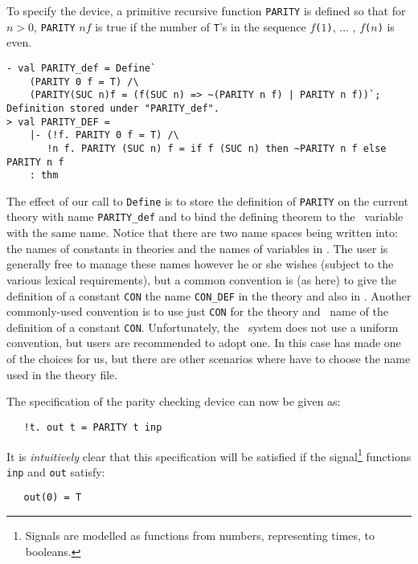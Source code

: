 \noindent To specify the device, a primitive recursive
function {\small\verb|PARITY|} is defined so that for $n>0$,
{\small\tt PARITY} $n f$ is true if the number of {\small\verb|T|}'s
in the sequence $f${\small\tt (}$1${\small\tt)}, $\ldots$ ,
$f${\small\tt (}$n${\small\tt)} is even.

\begin{session}
\begin{verbatim}
- val PARITY_def = Define`
    (PARITY 0 f = T) /\
    (PARITY(SUC n)f = (f(SUC n) => ~(PARITY n f) | PARITY n f))`;
Definition stored under "PARITY_def".
> val PARITY_DEF =
    |- (!f. PARITY 0 f = T) /\
       !n f. PARITY (SUC n) f = if f (SUC n) then ~PARITY n f else PARITY n f
    : thm
\end{verbatim}
\end{session}

\noindent
The effect of our call to {\small\verb|Define|} is to store the
definition of {\small\verb|PARITY|} on the current theory with name
{\small\verb|PARITY_def|} and to bind the defining theorem to the \ML\
variable with the same name.  Notice that there are two name spaces
being written into: the names of constants in theories and the names
of variables in \ML.  The user is generally free to manage these names
however he or she wishes (subject to the various lexical
requirements), but a common convention is (as here) to give the
definition of a constant {\small\tt CON} the name
{\small\verb|CON_DEF|} in the theory and also in \ML.  Another
commonly-used convention is to use just {\small\verb|CON|} for the
theory and \ML\ name of the definition of a constant
{\small\verb|CON|}.  Unfortunately, the \HOL\ system does not use a
uniform convention, but users are recommended to adopt one.  In this
case \ml{Define} has made one of the choices for us, but there are
other scenarios where have to choose the name used in the theory file.

The specification of the parity checking device can now be given as:

{\small\baselineskip\HOLSpacing\begin{verbatim}
   !t. out t = PARITY t inp
\end{verbatim}}

\noindent
It is {\it intuitively\/} clear that this specification will be
satisfied if the signal\footnote{Signals are modelled as functions
  from numbers, representing times, to booleans.} functions
{\small\verb|inp|} and {\small\verb|out|} satisfy:

{\small\baselineskip\HOLSpacing\begin{verbatim}
   out(0) = T
\end{verbatim}}

